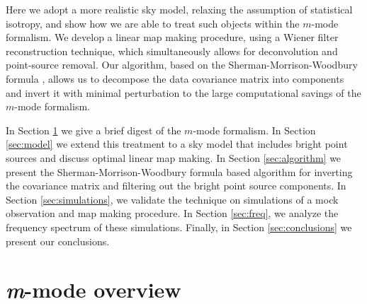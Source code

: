 Here we adopt a more realistic sky model, relaxing the assumption of statistical isotropy, and show how we are able to treat such objects within the $m$-mode formalism. We develop a linear map making procedure, using a Wiener filter reconstruction technique, which simultaneously allows for deconvolution and point-source removal. Our algorithm, based on the Sherman-Morrison-Woodbury formula \citep{smf1, smf2, woodbury}, allows us to decompose the data covariance matrix into components and invert it with minimal perturbation to the large computational savings of the $m$-mode formalism.

In Section \ref{sec:mmodes} we give a brief digest of the $m$-mode formalism. In Section \ref{sec:model} we extend this treatment to a sky model that includes bright point sources and discuss optimal linear map making. In Section \ref{sec:algorithm} we present the Sherman-Morrison-Woodbury formula based algorithm for inverting the covariance matrix and filtering out the bright point source components. In Section \ref{sec:simulations}, we validate the technique on simulations of a mock observation and map making procedure. In Section \ref{sec:freq}, we analyze the frequency spectrum of these simulations. Finally, in Section \ref{sec:conclusions} we present our conclusions.

\section{\textit{m}-mode overview}
\label{sec:mmodes}


